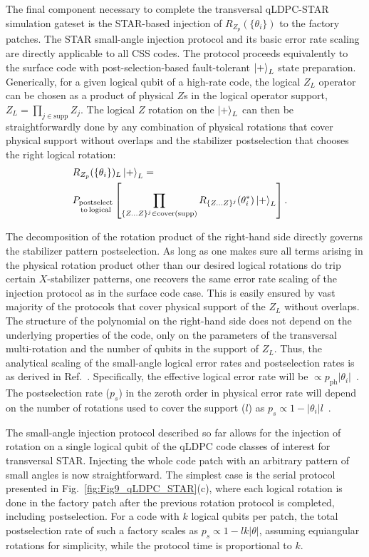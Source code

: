 \documentclass[aps, prx, reprint, superscriptaddress, longbibliography, floatfix]{revtex4-2}
\begin{document}
The final component necessary to complete the transversal qLDPC-STAR simulation gateset is the STAR-based injection of  $R_{Z_p}(\{\theta_i\})$ to the factory patches. The STAR small-angle injection protocol and its basic error rate scaling are directly applicable to all CSS codes. The protocol proceeds equivalently to the surface code with post-selection-based fault-tolerant $\ket{+}_L$ state preparation. Generically, for a given logical qubit of a high-rate code, the logical $Z_L$ operator can be chosen as a product of physical $Z$s in the logical operator support, $Z_L=\prod_{j\in \textrm{supp}} Z_j$. The logical $Z$ rotation on the $\ket{+}_L$ can then be straightforwardly done by any combination of physical rotations that cover physical support without overlaps and the stabilizer postselection that chooses the right logical rotation:
\begin{align}\label{eq:injection-qldpc}
&R_{Z_p}(\{\theta_i\})_L \ket{+}_L=\cr &P_{\substack{\mathrm{postselect} \\ \mathrm{to \, logical}}} \left[ \prod_{\{Z...Z\}^j \in \mathrm{cover}(\textrm{supp})}R_{\{Z...Z\}^j}{(\theta^*_i)}\ket{+}_L\right].
\end{align}

The decomposition of the rotation product of the right-hand side directly governs the stabilizer pattern postselection. As long as one makes sure all terms arising in the physical rotation product other than our desired logical rotations do trip certain $X$-stabilizer patterns, one recovers the same error rate scaling of the injection protocol as in the surface code case. This is easily ensured by vast majority of the protocols that cover physical support of the $Z_L$ without overlaps. The structure of the polynomial on the right-hand side does not depend on the underlying properties of the code, only on the parameters of the transversal multi-rotation and the number of qubits in the support of $Z_L$. Thus, the analytical scaling of the small-angle logical error rates and postselection rates is as derived in Ref.~\cite{Toshio2024}. Specifically, the effective logical error rate will be $\propto p_{\mathrm{ph}} |\theta_i|$~\cite{Choi2023, Toshio2024}. The postselection rate ($p_s$) in the zeroth order in physical error rate will depend on the number of rotations used to cover the support ($l$) as $p_s\propto 1-|\theta_i| l$~\cite{Toshio2024}.

The small-angle injection protocol described so far allows for the injection of rotation on a single logical qubit of the qLDPC code classes of interest for transversal STAR. Injecting the whole code patch with an arbitrary pattern of small angles is now straightforward. The simplest case is the serial protocol presented in Fig.~\ref{fig:Fig9_qLDPC_STAR}(c), where each logical rotation is done in the factory patch after the previous rotation protocol is completed, including postselection. For a code with $k$ logical qubits per patch, the total postselection rate of such a factory scales as $p_s\propto 1-l k|\theta|$, assuming equiangular rotations for simplicity, while the protocol time is proportional to $k$. 
\end{document}
